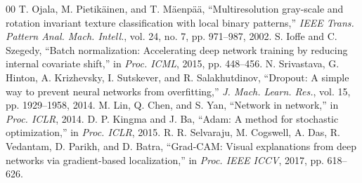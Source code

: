 \documentclass[conference]{IEEEtran}
\begin{document}
\begin{thebibliography}{00}
 T. Ojala, M. Pietik\"ainen, and T. M\"aenp\"a\"a, ``Multiresolution gray-scale and rotation invariant texture classification with local binary patterns,'' \textit{IEEE Trans. Pattern Anal. Mach. Intell.}, vol. 24, no. 7, pp. 971--987, 2002.
 S. Ioffe and C. Szegedy, ``Batch normalization: Accelerating deep network training by reducing internal covariate shift,'' in \textit{Proc. ICML}, 2015, pp. 448--456.
 N. Srivastava, G. Hinton, A. Krizhevsky, I. Sutskever, and R. Salakhutdinov, ``Dropout: A simple way to prevent neural networks from overfitting,'' \textit{J. Mach. Learn. Res.}, vol. 15, pp. 1929--1958, 2014.
 M. Lin, Q. Chen, and S. Yan, ``Network in network,'' in \textit{Proc. ICLR}, 2014.
 D. P. Kingma and J. Ba, ``Adam: A method for stochastic optimization,'' in \textit{Proc. ICLR}, 2015.
 R. R. Selvaraju, M. Cogswell, A. Das, R. Vedantam, D. Parikh, and D. Batra, ``Grad-CAM: Visual explanations from deep networks via gradient-based localization,'' in \textit{Proc. IEEE ICCV}, 2017, pp. 618--626.
\end{thebibliography}
\end{document}

